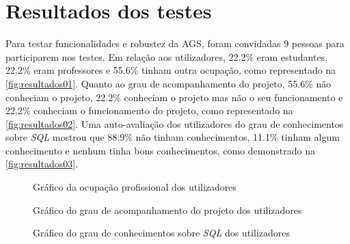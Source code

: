 \documentclass[11pt,twoside,a4paper]{report}
\begin{document}
\section{Resultados dos testes}
Para testar funcionalidades e robustez da AGS, foram convidadas 9 pessoas para participarem nos testes. Em relação aos utilizadores, 22.2\% eram estudantes, 22.2\% eram professores e 55.6\% tinham outra ocupação, como representado na \autoref{fig:resultados01}. Quanto ao grau de acompanhamento do projeto, 55.6\% não conheciam o projeto, 22.2\% conheciam o projeto mas não o seu funcionamento e 22.2\% conheciam o funcionamento do projeto, como representado na \autoref{fig:resultados02}. Uma auto-avaliação dos utilizadores do grau de conhecimentos sobre \textit{SQL} mostrou que 88.9\% não tinham conhecimentos, 11.1\% tinham algum conhecimento e nenhum tinha bons conhecimentos, como demonstrado na \autoref{fig:resultados03}.
\begin{figure}[H]
	\centering
	\hspace{-0.75cm}
	\caption{Gráfico da ocupação profissional dos utilizadores}
	\label{fig:resultados01}
\end{figure}
\begin{figure}[H]
	\centering
	\caption{Gráfico do grau de acompanhamento do projeto dos utilizadores}
	\label{fig:resultados02}
\end{figure}
\begin{figure}[H]
	\centering
	\hspace{-.5cm}
	\caption{Gráfico do grau de conhecimentos sobre \textit{SQL} dos utilizadores}
	\label{fig:resultados03}
\end{figure}
\end{document}
